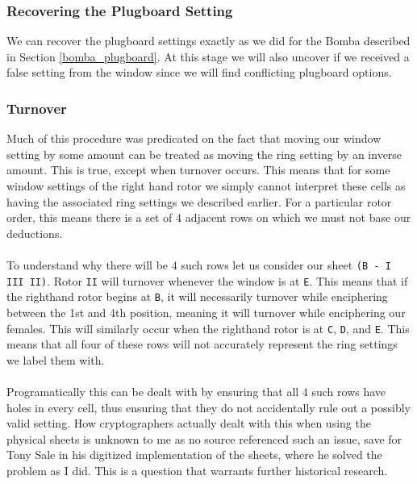 \subsubsection{Recovering the Plugboard Setting}
We can recover the plugboard settings exactly as we did for the Bomba
described in Section \ref{bomba_plugboard}. At this stage we will
also uncover if we received a false setting from the window since we
will find conflicting plugboard options.

\subsubsection{Turnover}
Much of this procedure was predicated on the fact that moving our
window setting by some amount can be treated as moving the ring
setting by an inverse amount. This is true, except when turnover
occurs. This means that for some window settings of the right hand
rotor we simply cannot interpret these cells as having the associated
ring settings we described earlier. For a particular rotor order,
this means there is a set of $4$ adjacent rows on which we must not base our deductions.\\\\To understand why there will be
$4$ such rows let us consider our sheet \texttt{(B - I III II)}.
Rotor \texttt{II} will turnover whenever the window is at \texttt{E}.
This means that if the righthand rotor begins at \texttt{B}, it will
necessarily turnover while enciphering between the 1st and 4th
position, meaning it will turnover while enciphering our females.
This will similarly occur when the righthand rotor is at \texttt{C},
\texttt{D}, and \texttt{E}. This means that all four of these rows
will not accurately represent the ring settings we label them with.
\\\\Programatically this can be dealt with by ensuring that all $4$
such rows have holes in every cell, thus ensuring that they do not
accidentally rule out a possibly valid setting. How cryptographers
actually dealt with this when using the physical sheets is unknown to
me as no source referenced such an issue, save for Tony Sale in his
digitized implementation of the sheets, where he solved the problem
as I did. This is a question that warrants further historical research.

